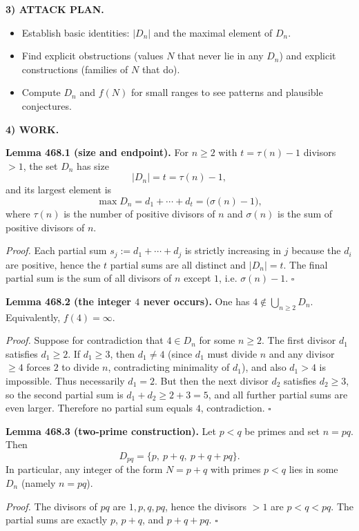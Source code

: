 \medskip
\noindent\textbf{3) ATTACK PLAN.}

\begin{itemize}
\item Establish basic identities: $|D_n|$ and the maximal element of $D_n$.
\item Find explicit obstructions (values $N$ that never lie in any $D_n$) and explicit constructions (families of $N$ that do).
\item Compute $D_n$ and $f(N)$ for small ranges to see patterns and plausible conjectures.
\end{itemize}

\medskip
\noindent\textbf{4) WORK.}

\noindent\textbf{Lemma 468.1 (size and endpoint).}
For $n\ge 2$ with $t=\tau(n)-1$ divisors $>1$, the set $D_n$ has size
\[
|D_n|=t=\tau(n)-1,
\]
and its largest element is
\[
\max D_n = d_1+\cdots+d_t = \bigl(\sigma(n)-1\bigr),
\]
where $\tau(n)$ is the number of positive divisors of $n$ and $\sigma(n)$ is the sum of positive divisors of $n$.

\textit{Proof.}
Each partial sum $s_j:=d_1+\cdots+d_j$ is strictly increasing in $j$ because the $d_i$ are positive, hence the $t$ partial sums are all distinct and $|D_n|=t$. The final partial sum is the sum of all divisors of $n$ except $1$, i.e. $\sigma(n)-1$. \hfill$\square$

\medskip
\noindent\textbf{Lemma 468.2 (the integer $4$ never occurs).}
One has $4\notin \bigcup_{n\ge 2} D_n$. Equivalently, $f(4)=\infty$.

\textit{Proof.}
Suppose for contradiction that $4\in D_n$ for some $n\ge 2$. The first divisor $d_1$ satisfies $d_1\ge 2$. If $d_1\ge 3$, then $d_1\ne 4$ (since $d_1$ must divide $n$ and any divisor $\ge 4$ forces $2$ to divide $n$, contradicting minimality of $d_1$), and also $d_1>4$ is impossible. Thus necessarily $d_1=2$. But then the next divisor $d_2$ satisfies $d_2\ge 3$, so the second partial sum is $d_1+d_2\ge 2+3=5$, and all further partial sums are even larger. Therefore no partial sum equals $4$, contradiction. \hfill$\square$

\medskip
\noindent\textbf{Lemma 468.3 (two-prime construction).}
Let $p<q$ be primes and set $n=pq$. Then
\[
D_{pq}=\{p,\ p+q,\ p+q+pq\}.
\]
In particular, any integer of the form $N=p+q$ with primes $p<q$ lies in some $D_n$ (namely $n=pq$).

\textit{Proof.}
The divisors of $pq$ are $1,p,q,pq$, hence the divisors $>1$ are $p<q<pq$. The partial sums are exactly $p$, $p+q$, and $p+q+pq$. \hfill$\square$

